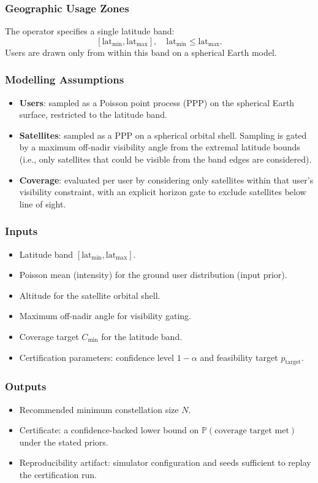 \documentclass[11pt,a4paper]{article}
\begin{document}
\subsubsection{Geographic Usage Zones}
The operator specifies a single latitude band:
$$
[\mathrm{lat}_{\min}, \mathrm{lat}_{\max}], \quad \mathrm{lat}_{\min} \le \mathrm{lat}_{\max}.
$$
Users are drawn only from within this band on a spherical Earth model.

\subsubsection{Modelling Assumptions}
\begin{itemize}
    \item \textbf{Users}: sampled as a Poisson point process (PPP) on the spherical Earth surface, restricted to the latitude
    band.
    \item \textbf{Satellites}: sampled as a PPP on a spherical orbital shell. Sampling is gated by a maximum off-nadir
    visibility angle from the extremal latitude bounds (i.e., only satellites that could be visible from the band edges
    are considered).
    \item \textbf{Coverage}: evaluated per user by considering only satellites within that user's visibility constraint,
    with an explicit horizon gate to exclude satellites below line of sight.
\end{itemize}

\subsubsection{Inputs}
\begin{itemize}
    \item Latitude band $[\mathrm{lat}_{\min}, \mathrm{lat}_{\max}]$.
    \item Poisson mean (intensity) for the ground user distribution (input prior).
    \item Altitude for the satellite orbital shell.
    \item Maximum off-nadir angle for visibility gating.
    \item Coverage target $C_{\min}$ for the latitude band.
    \item Certification parameters: confidence level $1-\alpha$ and feasibility target $p_{\mathrm{target}}$.
\end{itemize}

\subsubsection{Outputs}
\begin{itemize}
    \item Recommended minimum constellation size $N$.
    \item Certificate: a confidence-backed lower bound on $\mathbb{P}(\text{coverage target met})$ under the stated priors.
    \item Reproducibility artifact: simulator configuration and seeds sufficient to replay the certification run.
\end{itemize}
\end{document}
